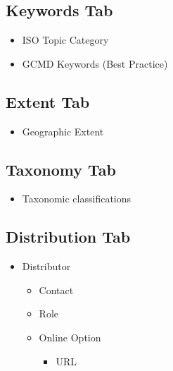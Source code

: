 \documentclass[
]{book}
\providecommand{\tightlist}{%
  \setlength{\itemsep}{0pt}\setlength{\parskip}{0pt}}
\begin{document}
\hypertarget{keywords-tab-1}{%
\subsection*{Keywords Tab}\label{keywords-tab-1}}

\begin{itemize}
\tightlist
\item
  ISO Topic Category
\item
  GCMD Keywords (Best Practice)
\end{itemize}

\hypertarget{extent-tab-1}{%
\subsection*{Extent Tab}\label{extent-tab-1}}

\begin{itemize}
\tightlist
\item
  Geographic Extent
\end{itemize}

\hypertarget{taxonomy-tab-1}{%
\subsection*{Taxonomy Tab}\label{taxonomy-tab-1}}

\begin{itemize}
\tightlist
\item
  Taxonomic classifications
\end{itemize}

\hypertarget{distribution-tab}{%
\subsection*{Distribution Tab}\label{distribution-tab}}

\begin{itemize}
\tightlist
\item
  Distributor

  \begin{itemize}
  \tightlist
  \item
    Contact
  \item
    Role
  \item
    Online Option

    \begin{itemize}
    \tightlist
    \item
      URL
    \end{itemize}
  \end{itemize}
\end{itemize}
\end{document}

